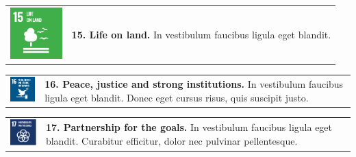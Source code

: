 \begin{multicols}{2}

    \small
    \setlength\tabcolsep{0pt}
    \renewcommand*{\arraystretch}{1}

    \noindent
    \begin{tabular}{p{25mm} p{46mm}}
        \vspace{0mm} \includegraphics[width=2cm]{text/appendix/appendix-sdg/resources/sdg15.pdf} & \vspace{-0.5mm} \textbf{15. Life on land.} In vestibulum faucibus ligula eget blandit.\\
    \end{tabular}

    \noindent
    \begin{tabular}{p{25mm} p{46mm}}
        \vspace{0mm} \includegraphics[width=2cm]{text/appendix/appendix-sdg/resources/sdg16.pdf} & \vspace{-0.5mm} \textbf{16. Peace, justice and strong institutions.} In vestibulum faucibus ligula eget blandit. Donec eget cursus risus, quis suscipit justo. \\
    \end{tabular}

    \noindent
    \begin{tabular}{p{25mm} p{46mm}}
        \vspace{0mm} \includegraphics[width=2cm]{text/appendix/appendix-sdg/resources/sdg17.pdf} & \vspace{-0.5mm} \textbf{17. Partnership for the goals.} In vestibulum faucibus ligula eget blandit. Curabitur efficitur, dolor nec pulvinar pellentesque. \\
    \end{tabular}

\end{multicols}